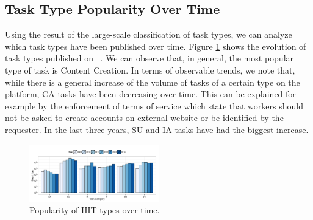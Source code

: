\subsection{Task Type Popularity Over Time}
Using the result of the large-scale classification of task types, we can analyze which task types have been published over time.
Figure \ref{fig:cat_trends} shows the evolution of task types published on \amt{}\ .
% 
We can observe that, in general, the most popular type of task is Content Creation.
% 
In terms of observable trends, we note that, while there is a general increase of the volume of tasks of a certain type on the platform,  CA tasks have been decreasing over time. This can be explained for example by the enforcement of \amt{} terms of service which state that workers should not be asked to create accounts on external website or be identified by the requester.
% 
In the last three years, SU and IA tasks have had the biggest increase.

\begin{figure}[htbp]
	\centering
		\includegraphics[width=0.5\textwidth]{figures/category_trends}
	\caption{Popularity of HIT types over time. }
	\label{fig:cat_trends}
\end{figure}

